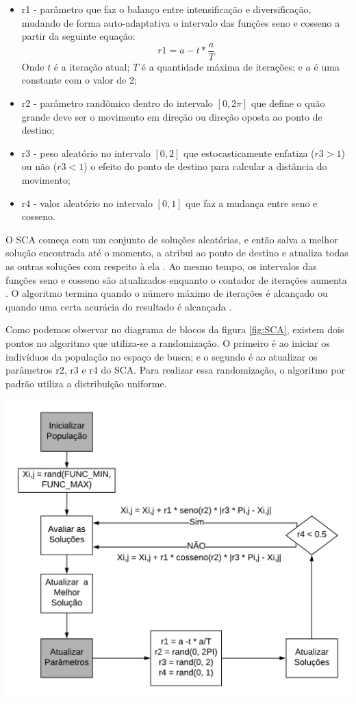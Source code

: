\begin{itemize}
    \item r1 - parâmetro que faz o balanço entre intensificação e diversificação, mudando de forma auto-adaptativa o intervalo das funções seno e cosseno a partir da seguinte equação:
    \begin{equation}
        r1 = a - t * \frac{a}{T}
    \end{equation}
    Onde $t$ é a iteração atual; $T$ é a quantidade máxima de iterações; e $a$ é uma constante com o valor de 2;
    \item r2 - parâmetro randômico dentro do intervalo $[0, 2\pi]$ que define o quão grande deve ser o movimento em direção ou direção oposta ao ponto de destino;
    \item r3 - peso aleatório no intervalo $[0, 2]$ que estocasticamente enfatiza ($r3 > 1$) ou não ($r3 < 1$) o efeito do ponto de destino para calcular a distância do movimento;
    \item r4 - valor aleatório no intervalo $[0, 1]$ que faz a mudança entre seno e cosseno.
\end{itemize}

O SCA começa com um conjunto de soluções aleatórias, e então salva a melhor solução encontrada até o momento, a atribui ao ponto de destino e atualiza todas as outras soluções com respeito à ela \cite{mirjalili}. Ao mesmo tempo, os intervalos das funções seno e cosseno são atualizados enquanto o contador de iterações aumenta \cite{mirjalili}. O algoritmo termina quando o número máximo de iterações é alcançado ou quando uma certa acurácia do resultado é alcançada \cite{mirjalili}.

Como podemos observar no diagrama de blocos da figura \ref{fig:SCA}, existem dois pontos no algoritmo que utiliza-se a randomização. O primeiro é ao iniciar os indivíduos da população no espaço de busca; e o segundo é ao atualizar os parâmetros r2, r3 e r4 do SCA. Para realizar essa randomização, o algoritmo por padrão utiliza a distribuição uniforme.

{
    \centering
    \includegraphics[width=0.7\linewidth]{figuras/Diagrama_SCA.png}
    \label{fig:SCA}
}

